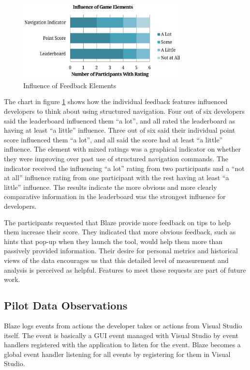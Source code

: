 \documentclass{sig-alternate}
\begin{document}
\begin{figure}
	\includegraphics[width=3.4in]{ElementInfluenceChart.pdf}
	\caption{Influence of Feedback Elements}
	\label{fig:elementInfluence}
\end{figure}

The chart in figure \ref{fig:elementInfluence} shows how the individual feedback features influenced developers to think about using structured navigation.  Four out of six developers said the leaderboard influenced them ``a lot'', and all rated the leaderboard as having at least ``a little'' influence.  Three out of six  said their individual point score influenced them ``a lot'', and all said the score had at least ``a little'' influence.  The element with mixed ratings was a graphical indicator on whether they were improving over past use of structured navigation commands.  The indicator received the influencing ``a lot'' rating from two participants and a ``not at all'' influence rating from one participant with the rest having at least ``a little'' influence.  The results indicate the more obvious and more clearly comparative information in the leaderboard was the strongest influence for developers.

The participants requested that Blaze provide more feedback on tips to help them increase their score. They indicated that more obvious feedback, such as hints that pop-up when they launch the tool, would help them more than passively provided information.  Their desire for personal metrics and historical views of the data encourages us that this detailed level of measurement and analysis is perceived as helpful.  Features to meet these requests are part of future work.    

\subsection{Pilot Data Observations}

Blaze logs events from actions the developer takes or actions from Visual Studio itself.  The event is basically a GUI event managed with Visual Studio by event handlers registered with the application to listen for the event.  Blaze becomes a global event handler listening for all events by registering for them in Visual Studio.  
\end{document}
